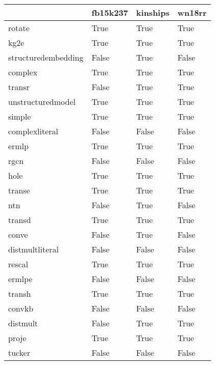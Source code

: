 \begin{tabular}{llll}
\toprule
{} &  fb15k237 &  kinships &  wn18rr \\
\midrule
rotate              &      True &      True &    True \\
kg2e                &      True &      True &    True \\
structuredembedding &     False &      True &   False \\
complex             &      True &      True &    True \\
transr              &     False &      True &    True \\
unstructuredmodel   &      True &      True &    True \\
simple              &      True &      True &    True \\
complexliteral      &     False &     False &   False \\
ermlp               &      True &      True &    True \\
rgcn                &     False &     False &   False \\
hole                &      True &      True &    True \\
transe              &      True &      True &    True \\
ntn                 &     False &      True &   False \\
transd              &      True &      True &    True \\
conve               &     False &      True &   False \\
distmultliteral     &     False &     False &   False \\
rescal              &      True &      True &    True \\
ermlpe              &     False &     False &   False \\
transh              &      True &      True &    True \\
convkb              &     False &     False &   False \\
distmult            &     False &      True &    True \\
proje               &      True &      True &    True \\
tucker              &     False &     False &   False \\
\bottomrule
\end{tabular}
